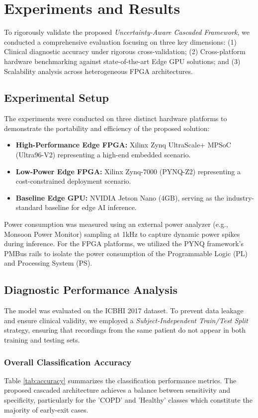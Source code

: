 \section{Experiments and Results}
\label{sec:experimentsResults}

To rigorously validate the proposed \textit{Uncertainty-Aware Cascaded Framework}, we conducted a comprehensive evaluation focusing on three key dimensions: (1) Clinical diagnostic accuracy under rigorous cross-validation; (2) Cross-platform hardware benchmarking against state-of-the-art Edge GPU solutions; and (3) Scalability analysis across heterogeneous FPGA architectures.

\subsection{Experimental Setup}
The experiments were conducted on three distinct hardware platforms to demonstrate the portability and efficiency of the proposed solution:
\begin{itemize}
    \item \textbf{High-Performance Edge FPGA:} Xilinx Zynq UltraScale+ MPSoC (Ultra96-V2) representing a high-end embedded scenario.
    \item \textbf{Low-Power Edge FPGA:} Xilinx Zynq-7000 (PYNQ-Z2) representing a cost-constrained deployment scenario.
    \item \textbf{Baseline Edge GPU:} NVIDIA Jetson Nano (4GB), serving as the industry-standard baseline for edge AI inference.
\end{itemize}

Power consumption was measured using an external power analyzer (e.g., Monsoon Power Monitor) sampling at 1kHz to capture dynamic power spikes during inference. For the FPGA platforms, we utilized the PYNQ framework's PMBus rails to isolate the power consumption of the Programmable Logic (PL) and Processing System (PS).

\subsection{Diagnostic Performance Analysis}
The model was evaluated on the ICBHI 2017 dataset. To prevent data leakage and ensure clinical validity, we employed a \textit{Subject-Independent Train/Test Split} strategy, ensuring that recordings from the same patient do not appear in both training and testing sets.

\subsubsection{Overall Classification Accuracy}
Table \ref{tab:accuracy} summarizes the classification performance metrics. The proposed cascaded architecture achieves a balance between sensitivity and specificity, particularly for the 'COPD' and 'Healthy' classes which constitute the majority of early-exit cases.

